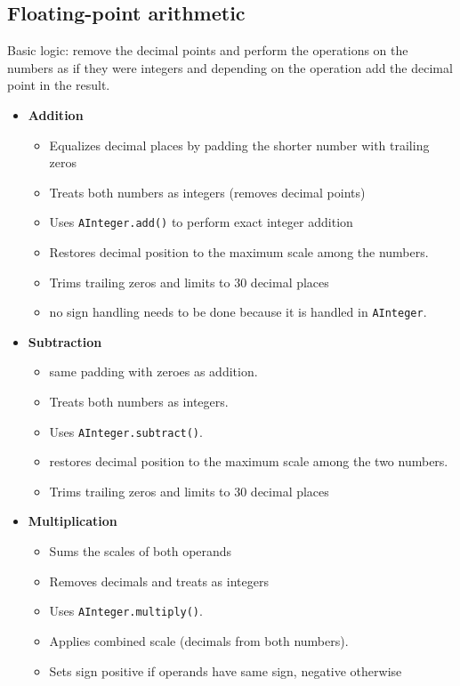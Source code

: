 \documentclass[12pt]{article}
\begin{document}
\begin{spacing}{1.2}
\begin{itemize}[leftmargin=*]
\end{itemize}
\subsection{Floating-point arithmetic}
Basic logic: remove the decimal points and perform the operations on the numbers as if they were integers and depending on the operation add the decimal point in the result.

\begin{itemize}[leftmargin=*]

    \item \textbf{Addition}
    \begin{itemize}
        \item Equalizes decimal places by padding the shorter number with trailing zeros
        \item Treats both numbers as integers (removes decimal points)
        \item Uses \texttt{AInteger.add()} to perform exact integer addition
        \item Restores decimal position to the maximum scale among the numbers.
        \item Trims trailing zeros and limits to 30 decimal places
        \item no sign handling needs to be done because it is handled in \texttt{AInteger}.
    \end{itemize}

    \item \textbf{Subtraction}
    \begin{itemize}
        \item same padding with zeroes as addition.
        \item Treats both numbers as integers.
        \item Uses \texttt{AInteger.subtract()}.
        \item restores decimal position to the maximum scale among the two numbers.
        \item Trims trailing zeros and limits to 30 decimal places
    \end{itemize}

    \item \textbf{Multiplication}
    \begin{itemize}
        \item Sums the scales of both operands
        \item Removes decimals and treats as integers
        \item Uses \texttt{AInteger.multiply()}.
        \item Applies combined scale (decimals from both numbers).
        \item Sets sign positive if operands have same sign, negative otherwise
    \end{itemize}


\end{itemize}
\end{spacing}
\end{document}
